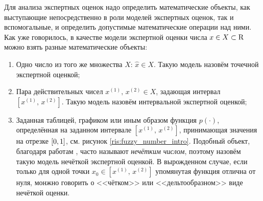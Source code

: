
\label{sec:math_methods_global}


Для анализа экспертных оценок надо определить математические объекты, как выступающие непосредственно в роли моделей экспертных оценок, так и вспомогальные, и определить допустимые математические операции над ними. Как уже говорилось, в качестве модели экспертной оценки числа $x \in X \subset {\mathrm{R}}$ можно взять разные математические объекты: %
\begin{enumerate}
  \item Одно число из того же множества $X$: $\hat{x} \in X$. Такую модель назовём точечной экспертной оценкой;
  \item Пара действительных чисел $x^{(1)},\, x^{(2)} \in X$, задающая интервал $[x^{(1)},\, x^{(2)}]$. Такую модель назовём интервальной экспертной оценкой;
  \item Заданная таблицей, графиком или иным образом функция $p(\cdot)$, определённая на заданном интервале $[x^{(1)},\, x^{(2)}]$, принимающая значения на отрезке $[0,1]$, см. рисунок \ref{ris:fuzzy_number_intro}.  Подобный объект, благодаря работам \cite{citeZadeh, dubois_prade-1990}, часто называют {\sl нечётким числом}, поэтому назовём такую модель нечёткой экспертной оценкой. В вырожденном случае, если только для одной точки $x_0 \in [x^{(1)},\, x^{(2)}]$ упомянутая функция отлична от нуля, монжно говорить о <<чётком>> или <<дельтообразном>> виде нечёткой оценки. 
\end{enumerate}


